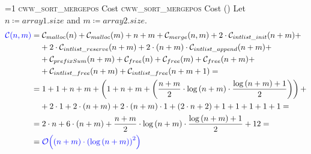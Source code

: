\setcounter{cwwSortMergePoscostcounter}{1}
\newcommand{\cwwSortMergePoscostframe}{%
    \ifnum\value{cwwSortMergePoscostcounter}=1
        \textsc{cww\_sort\_mergepos} Cost%
    \else
        \textsc{cww\_sort\_mergepos} Cost (\thecwwSortMergePoscostcounter)%
    \fi
}
            \begin{frame}{\cwwSortMergePoscostframe}
                \small
                Let $n \coloneqq array1.size$ and $m \coloneqq array2.size$.
                \begin{align*}
                    \textcolor{blue}{\mathcal{C}{\left(n, m\right)}} = & \; \mathcal{C}_{malloc}{\left(n\right)} + \mathcal{C}_{malloc}{\left(m\right)} + n + m + \mathcal{C}_{merge}{\left(n, m\right)} + 2 \cdot \mathcal{C}_{intlist\_init}{\left(n + m\right)} + \\
                    & + 2 \cdot \mathcal{C}_{intlist\_reserve}{\left(n + m\right)} + 2 \cdot \left(n + m\right) \cdot \mathcal{C}_{intlist\_append}{\left(n + m\right)} + \\
                    & + \mathcal{C}_{prefixSum}{\left(n + m\right)} + \mathcal{C}_{free}{\left(n\right)} + \mathcal{C}_{free}{\left(m\right)} + \mathcal{C}_{free}{\left(n + m\right)} + \\
                    & + \mathcal{C}_{intlist\_free}{\left(n + m\right)} + \mathcal{C}_{intlist\_free}{\left(n + m + 1\right)} = \\
                    = & \; 1 + 1 + n + m + \left(1 + n + m + \left(\frac{n + m}{2} \cdot \log{\left(n + m\right)} \cdot \frac{\log{\left(n + m\right)} + 1}{2}\right)\right) + \\
                    & + 2 \cdot 1 + 2 \cdot \left(n + m\right) + 2 \cdot \left(n + m\right) \cdot 1 + \left(2 \cdot n + 2\right) + 1 + 1 + 1 + 1 + 1 = \\
                    = & \; 2 \cdot n + 6 \cdot \left(n + m\right) + \frac{n + m}{2} \cdot \log{\left(n + m\right)} \cdot \frac{\log{\left(n + m\right)} + 1}{2} + 12 = \\
                    = & \; \textcolor{blue}{\mathcal{O}{\left(\left(n + m\right) \cdot \left(\log{\left(n + m\right)}\right)^2\right)}}
                \end{align*}
            \end{frame}

